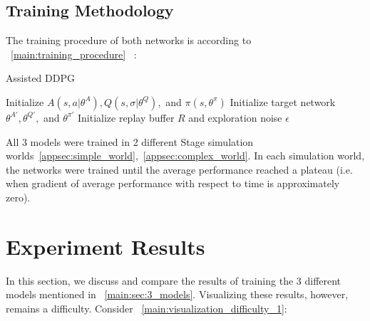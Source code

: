 \subsection{Training Methodology}
The training procedure of both networks is according to ~\autoref{main:training_procedure} ~\cite{xie_learning_2018}:
\begin{algorithm}
\caption{Assisted DDPG}
\label{main:training_procedure}
Initialize $A(s, a|\theta^A), Q(s, \sigma|\theta^Q),$ and $\pi(s, \theta^\pi)$\;
Initialize target network $\theta^{A'}, \theta^{Q'},$ and $\theta^{\pi'}$\;
Initialize replay buffer $R$ and exploration noise $\epsilon$\;
\end{algorithm}
\newpage

All 3 models were trained in 2 different Stage simulation worlds~\autoref{appsec:simple_world},~\autoref{appsec:complex_world}. In each simulation world, the networks were trained until the average performance reached a plateau (i.e. when gradient of average performance with respect to time is approximately zero).


\section{Experiment Results}
In this section, we discuss and compare the results of training the 3 different models mentioned in ~\autoref{main:sec:3_models}. Visualizing these results, however, remains a difficulty. Consider ~\autoref{main:visualization_difficulty_1}:

